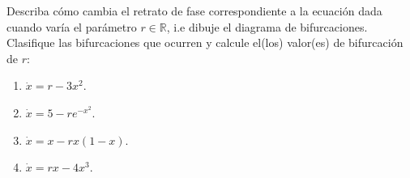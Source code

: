 \documentclass[../pheader.tex]{subfiles}
\begin{document}
\begin{problema}
Describa cómo cambia el retrato de fase correspondiente a la ecuación dada
cuando varía el parámetro \(r\in \mathbb{R}\), i.e dibuje el diagrama de
bifurcaciones. Clasifique las bifurcaciones que ocurren y calcule el(los)
valor(es) de bifurcación de \(r\):
{\setlength\multicolsep{0pt}
\begin{multicols}{2}
\begin{enumerate}[topsep=0pt,itemsep=0pt]
    \item \(\dot{x} = r - 3x^2\).
    \item \(\dot{x} = 5 - re^{-x^2}\).
    \item \(\dot{x} = x - rx(1-x)\).
    \item \(\dot{x} = rx - 4x^3\).
\end{enumerate}
\end{multicols}}
\end{problema}
\end{document}
